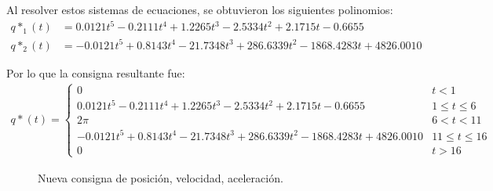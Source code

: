 \documentclass[a4paper, 10pt, onecolumn,journal]{ieeeconf}
\begin{document}
Al resolver estos sistemas de ecuaciones, se obtuvieron los siguientes polinomios:
\begin{align}
	q*_1(t) &= 0.0121t^5 - 0.2111t^4 + 1.2265t^3 - 2.5334t^2 + 2.1715t - 0.6655\\
	q*_2(t) &= -0.0121t^5 + 0.8143t^4 - 21.7348t^3 + 286.6339t^2 - 1868.4283t + 4826.0010
\end{align}
 
Por lo que la consigna resultante fue:
\begin{align}
	q*(t) =
	\begin{cases}
		0  &  t<1 \\
		 0.0121t^5 - 0.2111t^4 + 1.2265t^3 - 2.5334t^2 + 2.1715t - 0.6655  &  1 \leq t \leq 6 \\
		2\pi  &  6 < t < 11 \\
		-0.0121t^5 + 0.8143t^4 - 21.7348t^3 + 286.6339t^2 - 1868.4283t + 4826.0010  &  11 \leq t \leq 16 \\
		0  &  t>16
	\end{cases}
\end{align}

\begin{figure}[H]
	\centering
	\begin{adjustbox}{max width=\columnwidth}
	\end{adjustbox}
	\caption{Nueva consigna de posición, velocidad, aceleración.}
	\label{Nueva consigna de posición, velocidad, aceleración}
\end{figure}
\end{document}
